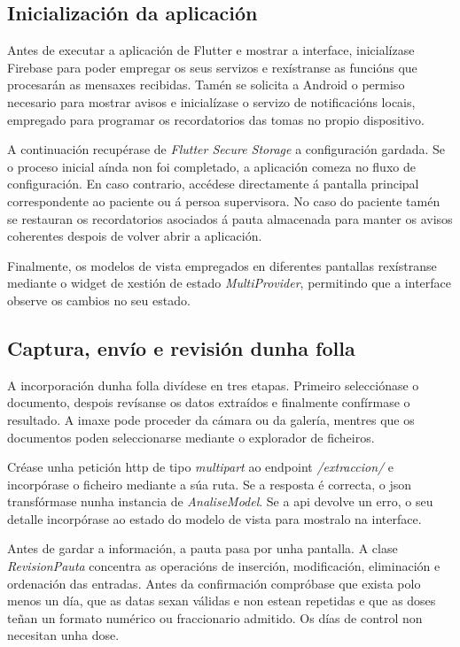 \subsection{Inicialización da aplicación}

Antes de executar a aplicación de Flutter e mostrar a interface, inicialízase Firebase para poder empregar os seus servizos e rexístranse as funcións que procesarán as mensaxes recibidas. Tamén se solicita a Android o permiso necesario para mostrar avisos e inicialízase o servizo de notificacións locais, empregado para programar os recordatorios das tomas no propio dispositivo.

A continuación recupérase de \textit{Flutter Secure Storage} a configuración gardada. Se o proceso inicial aínda non foi completado, a aplicación comeza no fluxo de configuración. En caso contrario, accédese directamente á pantalla principal correspondente ao paciente ou á persoa supervisora. No caso do paciente tamén se restauran os recordatorios asociados á pauta almacenada para manter os avisos coherentes despois de volver abrir a aplicación.

Finalmente, os modelos de vista empregados en diferentes pantallas rexístranse mediante o widget de xestión de estado \textit{MultiProvider}, permitindo que a interface observe os cambios no seu estado.


\subsection{Captura, envío e revisión dunha folla}

A incorporación dunha folla divídese en tres etapas. Primeiro selecciónase o documento, despois revísanse os datos extraídos e finalmente confírmase o resultado. A imaxe pode proceder da cámara ou da galería, mentres que os documentos poden seleccionarse mediante o explorador de ficheiros.

Créase unha petición \gls{http} de tipo \textit{multipart} ao endpoint \textit{/extraccion/} e incorpórase o ficheiro mediante a súa ruta. Se a resposta é correcta, o \gls{json} transfórmase nunha instancia de \textit{AnaliseModel}. Se a \gls{api} devolve un erro, o seu detalle incorpórase ao estado do modelo de vista para mostralo na interface.

Antes de gardar a información, a pauta pasa por unha pantalla. A clase \textit{RevisionPauta} concentra as operacións de inserción, modificación, eliminación e ordenación das entradas. Antes da confirmación compróbase que exista polo menos un día, que as datas sexan válidas e non estean repetidas e que as doses teñan un formato numérico ou fraccionario admitido. Os días de control non necesitan unha dose.

